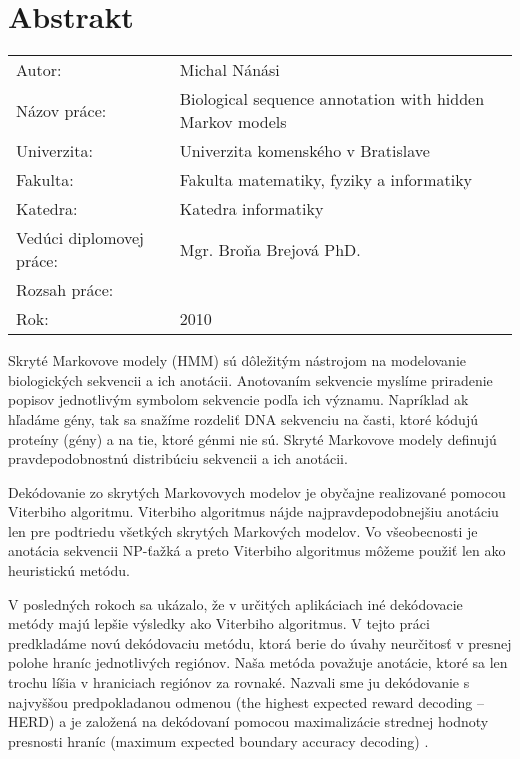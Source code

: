 \documentclass[12pt,oneside]{book}
\begin{document}
\frontmatter



\mainmatter



\backmatter



\nocite{*}



\chapter*{Abstrakt}
\begin{tabular}{l l}
Autor: & Michal Nánási \\
Názov práce: & Biological sequence annotation with hidden Markov models\\
Univerzita: & Univerzita komenského v Bratislave \\
Fakulta: & Fakulta matematiky, fyziky a informatiky\\
Katedra: & Katedra informatiky \\
Vedúci diplomovej práce: & Mgr. Broňa Brejová PhD.\\
Rozsah práce: & \pageref{LastPage} \\
Rok: & 2010
\end{tabular}

\bigskip


Skryté Markovove modely (HMM) sú dôležitým nástrojom na modelovanie
biologických sekvencii a ich anotácii. Anotovaním sekvencie myslíme priradenie
popisov jednotlivým symbolom sekvencie podľa ich významu. Napríklad ak hľadáme
gény, tak sa snažíme rozdeliť DNA sekvenciu na časti, ktoré kódujú proteíny
(gény) a na tie, ktoré génmi nie sú.  Skryté Markovove modely definujú
pravdepodobnostnú distribúciu sekvencii a ich anotácii.

Dekódovanie zo skrytých Markovovych modelov je obyčajne realizované pomocou
Viterbiho algoritmu. Viterbiho algoritmus nájde najpravdepodobnejšiu anotáciu
len pre podtriedu všetkých skrytých Markových modelov.  Vo všeobecnosti je anotácia
sekvencii NP-ťažká a preto Viterbiho algoritmus môžeme použiť len ako
heuristickú metódu.

V posledných rokoch sa ukázalo, že v určitých aplikáciach iné dekódovacie
metódy majú lepšie výsledky ako Viterbiho algoritmus. V tejto práci predkladáme
novú dekódovaciu metódu, ktorá berie do úvahy neurčitosť v presnej polohe hraníc
jednotlivých regiónov. Naša metóda považuje anotácie, ktoré sa len trochu líšia
v hraniciach regiónov za rovnaké. Nazvali sme ju dekódovanie s najvyššou
predpokladanou odmenou (the highest expected reward decoding -- HERD) a je
založená na dekódovaní pomocou maximalizácie strednej hodnoty presnosti hraníc
(maximum expected boundary accuracy decoding) \cite{Gross2007}.
\end{document}
